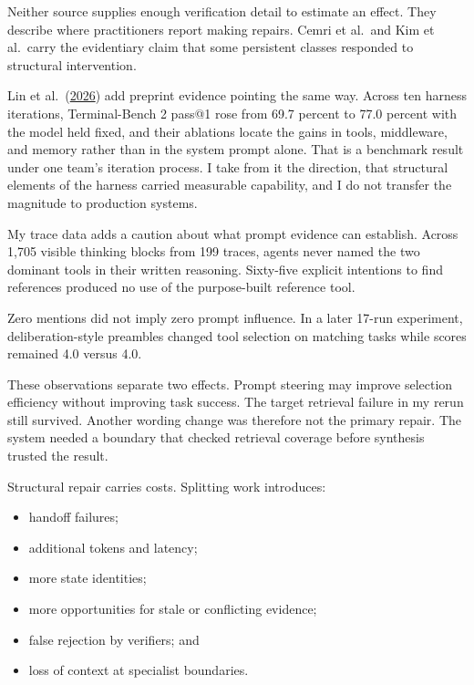 Neither source supplies enough verification detail to estimate an effect. They describe where practitioners report making repairs. Cemri et al.~and Kim et al.~carry the evidentiary claim that some persistent classes responded to structural intervention.

Lin et al.~(\href{https://arxiv.org/abs/2604.25850}{2026}) add preprint evidence pointing the same way. Across ten harness iterations, Terminal-Bench 2 pass@1 rose from 69.7 percent to 77.0 percent with the model held fixed, and their ablations locate the gains in tools, middleware, and memory rather than in the system prompt alone. That is a benchmark result under one team's iteration process. I take from it the direction, that structural elements of the harness carried measurable capability, and I do not transfer the magnitude to production systems.

My trace data adds a caution about what prompt evidence can establish. Across 1,705 visible thinking blocks from 199 traces, agents never named the two dominant tools in their written reasoning. Sixty-five explicit intentions to find references produced no use of the purpose-built reference tool.

Zero mentions did not imply zero prompt influence. In a later 17-run experiment, deliberation-style preambles changed tool selection on matching tasks while scores remained 4.0 versus 4.0.

These observations separate two effects. Prompt steering may improve selection efficiency without improving task success. The target retrieval failure in my rerun still survived. Another wording change was therefore not the primary repair. The system needed a boundary that checked retrieval coverage before synthesis trusted the result.


Structural repair carries costs. Splitting work introduces:

\begin{itemize}
\tightlist
\item
  handoff failures;
\item
  additional tokens and latency;
\item
  more state identities;
\item
  more opportunities for stale or conflicting evidence;
\item
  false rejection by verifiers; and
\item
  loss of context at specialist boundaries.
\end{itemize}

